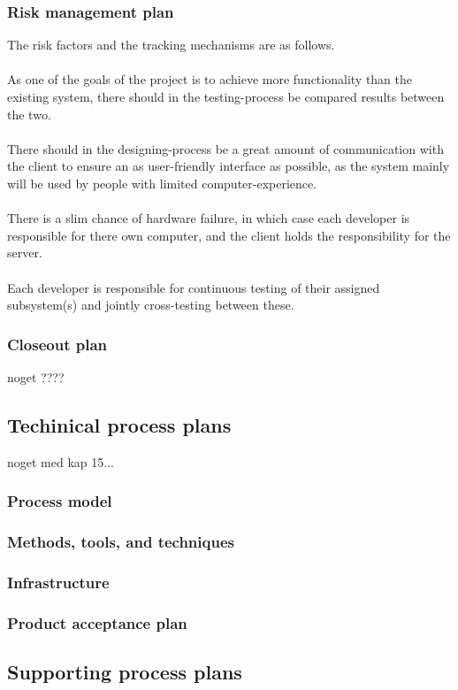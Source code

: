\documentclass[12pt]{article}
\begin{document}
\subsubsection{Risk management plan}
The risk factors and the tracking mechanisms are as follows. \\\\
As one of the goals of the project is to achieve more functionality than the existing system, there should in the testing-process be compared results between the two. \\\\
There should in the designing-process be a great amount of communication with the client to ensure an as user-friendly interface as possible, as the system mainly will be used by people with limited computer-experience. \\\\
There is a slim chance of hardware failure, in which case each developer is responsible for there own computer, and the client holds the responsibility for the server. \\\\
Each developer is responsible for continuous testing of their assigned subsystem(s) and jointly cross-testing between these.
\subsubsection{Closeout plan}
noget ????  
\subsection{Techinical process plans}
noget med kap 15...
\subsubsection{Process model}
\subsubsection{Methods, tools, and techniques}
\subsubsection{Infrastructure}
\subsubsection{Product acceptance plan}

\subsection{Supporting process plans}
\end{document}
